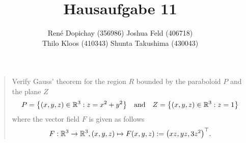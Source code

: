 \documentclass[english]{exercise}
\title{Hausaufgabe 11}
\author{René Dopichay (356986) \quad Joshua Feld (406718)\\Thilo Kloos (410343) \quad Shunta Takushima (430043)}
\begin{document}
	\maketitle


	\section{}

	\begin{quote}
		Verify Gauss' theorem for the region \(R\) bounded by the paraboloid \(P\) and the plane \(Z\)
		\[
			P = \braces*{\parentheses*{x, y, z} \in \R^3 : z = x^2 + y^2} \quad \text{and} \quad Z = \braces*{\parentheses*{x, y, z} \in \R^3 : z = 1}
		\]
		where the vector field \(F\) is given as follows
		\[
			F: \R^3 \to \R^3, \parentheses*{x, y, z} \mapsto F\parentheses*{x, y, z} := \parentheses*{xz, yz, 3z^2}^\top.
		\]
	\end{quote}
\end{document}
